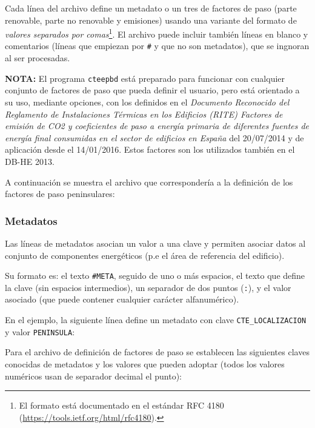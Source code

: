 \documentclass[10pt,notitlepage,oneside,a4paper]{article}
\begin{document}
Cada línea del archivo define un metadato o un tres de factores de paso (parte renovable, parte no renovable y emisiones) usando una variante del formato de \textit{valores separados por comas}\footnote{El formato está documentado en el estándar RFC 4180 (\url{https://tools.ietf.org/html/rfc4180}).}. El archivo puede incluir también líneas en blanco y comentarios (líneas que empiezan por \texttt{\#} y que no son metadatos), que se ingnoran al ser procesadas.

\begin{myquote}\small
\textbf{NOTA:} El programa \texttt{cteepbd} está preparado para funcionar con cualquier conjunto de factores de paso que pueda definir el usuario, pero está orientado a su uso, mediante opciones, con los definidos en el \textit{Documento Reconocido del Reglamento de Instalaciones Térmicas en los Edificios (RITE) Factores de emisión de CO2 y coeficientes de paso a energía primaria de diferentes fuentes de energía final consumidas en el sector de edificios en España} del 20/07/2014 y de aplicación desde el 14/01/2016. Estos factores son los utilizados también en el DB-HE 2013.
\end{myquote}

A continuación se muestra el archivo que correspondería a la definición de los factores de paso peninsulares:



\subsubsection{Metadatos}

Las líneas de metadatos asocian un valor a una clave y permiten asociar datos al conjunto de componentes energéticos (p.e el área de referencia del edificio).

Su formato es: el texto \texttt{\#META}, seguido de uno o más espacios, el texto que define la clave (sin espacios intermedios), un separador de dos puntos (\texttt{:}), y el valor asociado (que puede contener cualquier carácter alfanumérico).

En el ejemplo, la siguiente línea define un metadato con clave \texttt{CTE\_LOCALIZACION} y valor \texttt{PENINSULA}:



Para el archivo de definición de factores de paso se establecen las siguientes claves conocidas de metadatos y los valores que pueden adoptar (todos los valores numéricos usan de separador decimal el punto):
\end{document}
